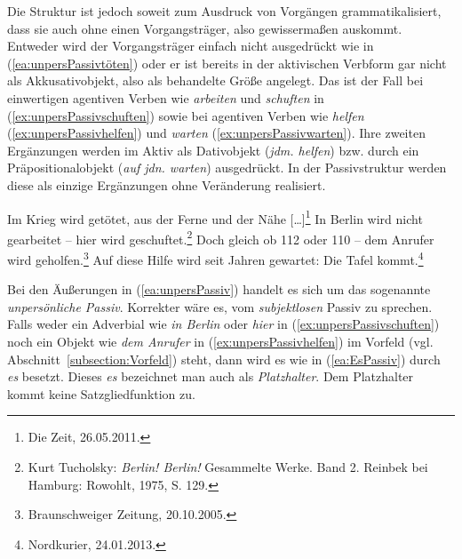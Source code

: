 \ea \label{ea:keinPassivbekommen}
\label{ea:*bekommenPass} 
\label{ex:bekommenAkt}
\z 
\z 

\ea \label{ea:keinPassivkosten}
\label{ea:kostenPass}
\label{ex:kostenAkt}
\z 
\z 

Die Struktur ist jedoch soweit zum Ausdruck von Vorgängen grammatikalisiert, dass sie auch ohne einen Vorgangsträger, also gewissermaßen  auskommt. Entweder wird der Vorgangsträger einfach nicht ausgedrückt wie in (\ref{ea:unpersPassivtöten}) oder er ist bereits in der aktivischen Verbform gar nicht als Akkusativobjekt, also als behandelte Größe angelegt. Das ist der Fall bei einwertigen agentiven Verben wie \textit{arbeiten} und \textit{schuften} in (\ref{ex:unpersPassivschuften}) sowie bei agentiven Verben wie \textit{helfen} (\ref{ex:unpersPassivhelfen}) und \textit{warten} (\ref{ex:unpersPassivwarten}). Ihre zweiten Ergänzungen werden im Aktiv als Dativobjekt (\textit{jdm. helfen}) bzw. durch ein Präpositionalobjekt (\textit{auf jdn. warten}) ausgedrückt. In der Passivstruktur werden diese als einzige Ergänzungen ohne Veränderung realisiert. 

\ea \label{ea:unpersPassiv}
\ea \label{ea:unpersPassivtöten} Im Krieg wird getötet, aus der Ferne und der Nähe [\ldots{}]\footnote{Die Zeit, 26.05.2011.}
\ex \label{ex:unpersPassivschuften} In Berlin wird nicht gearbeitet -- hier wird geschuftet.\footnote{Kurt Tucholsky: \textit{Berlin! Berlin!} Gesammelte Werke. Band 2. Reinbek bei Hamburg: Rowohlt, 1975, S. 129.}
\ex \label{ex:unpersPassivhelfen} Doch gleich ob 112 oder 110 -- dem Anrufer wird geholfen.\footnote{Braunschweiger Zeitung, 20.10.2005.}
\ex \label{ex:unpersPassivwarten} Auf diese Hilfe wird seit Jahren gewartet: Die Tafel kommt.\footnote{Nordkurier, 24.01.2013.} 
\z 
\z 

Bei den Äußerungen in (\ref{ea:unpersPassiv}) handelt es sich um das sogenannte \textit{unpersönliche Passiv}. Korrekter wäre es, vom \textit{subjektlosen} Passiv zu sprechen. Falls weder ein Adverbial wie \textit{in Berlin} oder \textit{hier} in (\ref{ex:unpersPassivschuften}) noch ein Objekt wie \textit{dem Anrufer} in (\ref{ex:unpersPassivhelfen}) im Vorfeld (vgl. Abschnitt~\ref{subsection:Vorfeld}) steht, dann wird es wie in (\ref{ea:EsPassiv}) durch \textit{es} besetzt. Dieses \textit{es} bezeichnet man auch als \textit{Platzhalter}. Dem Platzhalter kommt keine Satzgliedfunktion zu.  

